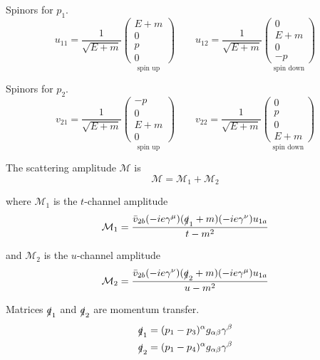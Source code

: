 Spinors for $p_1$.
\begin{equation*}
u_{11}=\frac{1}{\sqrt{E+m}}
\underset{\text{spin up}}
{\begin{pmatrix}E+m\\0\\p\\0\end{pmatrix}}
\qquad
u_{12}=\frac{1}{\sqrt{E+m}}
\underset{\text{spin down}}
{\begin{pmatrix}0\\E+m\\0\\-p\end{pmatrix}}
\end{equation*}

Spinors for $p_2$.
\begin{equation*}
v_{21}=\frac{1}{\sqrt{E+m}}
\underset{\text{spin up}}
{\begin{pmatrix}-p\\0\\E+m\\0\end{pmatrix}}
\qquad
v_{22}=\frac{1}{\sqrt{E+m}}
\underset{\text{spin down}}
{\begin{pmatrix}0\\p\\0\\E+m\end{pmatrix}}
\end{equation*}

The scattering amplitude $\mathcal M$ is
\begin{equation*}
\mathcal M=\mathcal M_1+\mathcal M_2
\end{equation*}

where $\mathcal M_1$ is the $t$-channel amplitude
\begin{equation*}
\mathcal M_1=\frac{\bar v_{2b}(-ie\gamma^\mu)(\slashed q_1+m)(-ie\gamma^\nu)u_{1a}}{t-m^2}
\end{equation*}

and $\mathcal M_2$ is the $u$-channel amplitude
\begin{equation*}
\mathcal M_2=\frac{\bar v_{2b}(-ie\gamma^\nu)(\slashed q_2+m)(-ie\gamma^\mu)u_{1a}}{u-m^2}
\end{equation*}

Matrices $\slashed q_1$ and $\slashed q_2$ are momentum transfer.
\begin{align*}
\slashed q_1&=(p_1-p_3)^\alpha g_{\alpha\beta}\gamma^\beta
\\
\slashed q_2&=(p_1-p_4)^\alpha g_{\alpha\beta}\gamma^\beta
\end{align*}

